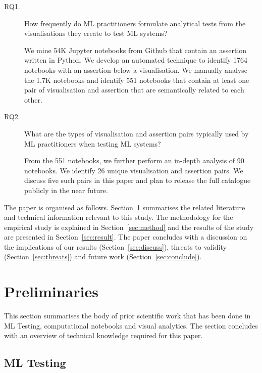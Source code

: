 \documentclass[conference]{IEEEtran}
\begin{document}
\begin{description}
\item[RQ1.] How frequently do ML practitioners formulate analytical
  tests from the visualisations they create to test ML systems?

We mine 54K Jupyter notebooks from Github that contain an assertion
    written in Python. We develop an automated technique to identify
    1764 notebooks with an assertion below a visualisation. We
    manually analyse the 1.7K notebooks and identify 551 notebooks
    that contain at least one pair of visualisation and assertion that
    are semantically related to each other.

\item[RQ2.] What are the types of visualisation and assertion pairs
  typically used by ML practitioners when testing ML systems?

From the 551 notebooks, we further perform an in-depth analysis of 90
    notebooks. We identify 26 unique visualisation and assertion
    pairs. We discuss five such pairs in this paper and plan to
    release the full catalogue publicly in the near future.
\end{description}


The paper is organised as follows. Section~\ref{sec:prelim} summarises
the related literature and technical information relevant to this
study. The methodology for the empirical study is explained in
Section~\ref{sec:method} and the results of the study are presented in
Section~\ref{sec:result}. The paper concludes with a discussion on the
implications of our results (Section~\ref{sec:discuss}), threats to
validity (Section~\ref{sec:threats}) and future work
(Section~\ref{sec:conclude}).

\section{Preliminaries}\label{sec:prelim}


This section summarises the body of prior scientific work that has
been done in ML Testing, computational notebooks and visual
analytics. The section concludes with an overview of technical
knowledge required for this paper.

\subsection{ML Testing}\label{sec:ml-testing}
\end{document}
